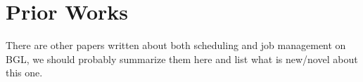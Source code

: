 \section{Prior Works}
There are other papers \cite{Aridor:Open} \cite{Aridor:Resource} \cite{Krevat:Job} written about both scheduling and job
management on BGL, we should probably summarize them here and list
what is new/novel about this one.
